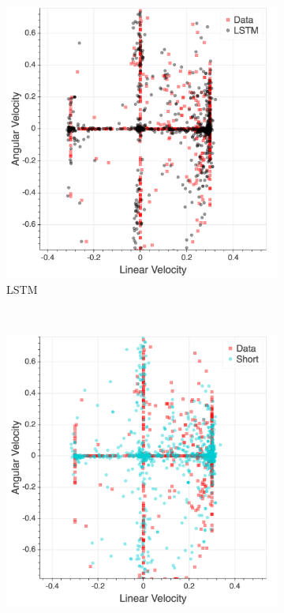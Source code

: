 \documentclass[letterpaper, 10 pt, conference]{ieeeconf}
\begin{document}
\begin{figure}[tbh]
\begin{subfigure}[b]{0.45\columnwidth}
    \includegraphics[scale = 0.09]{images/lstm_dist.png}
    \caption{LSTM}
       \label{fig:data2}
  \end{subfigure} 
  \\
        \begin{subfigure}[b]{0.45\columnwidth}
    \includegraphics[scale = 0.09]{images/short_dist.png}

\end{subfigure}
\end{figure}
\end{document}
